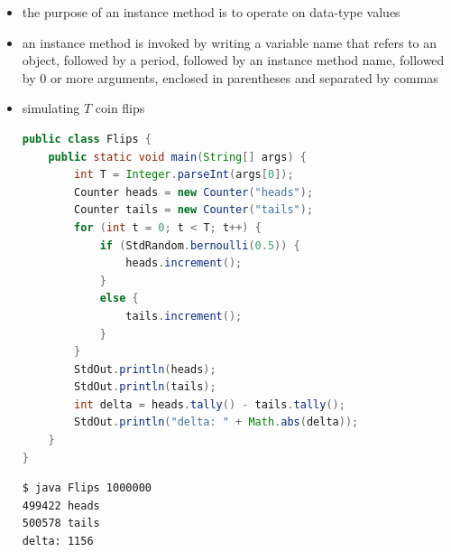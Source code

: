 \documentclass[8pt,a4paper,compress]{beamer}
\begin{document}
\begin{frame}[fragile]
\begin{itemize}
\item the purpose of an instance method is to operate on data-type values

\item an instance method is invoked by writing a variable name that refers to an object, followed by a period, followed by an instance method name, followed by 0 or more arguments, enclosed in parentheses and separated by commas 

\item simulating $T$ coin flips
\begin{lstlisting}[language=Java]
public class Flips {
    public static void main(String[] args) {
        int T = Integer.parseInt(args[0]);
        Counter heads = new Counter("heads");
        Counter tails = new Counter("tails");
        for (int t = 0; t < T; t++) {
            if (StdRandom.bernoulli(0.5)) {
                heads.increment();
            }
            else {
                tails.increment();
            }
        }
        StdOut.println(heads);
        StdOut.println(tails);
        int delta = heads.tally() - tails.tally();
        StdOut.println("delta: " + Math.abs(delta));
    }
}
\end{lstlisting}

\begin{lstlisting}[language={}]
$ java Flips 1000000
499422 heads
500578 tails
delta: 1156
\end{lstlisting}
\end{itemize}
\end{frame}
\end{document}
